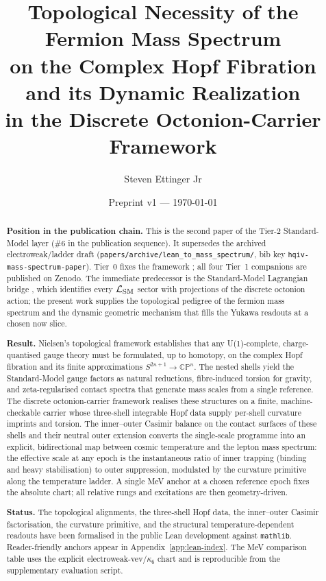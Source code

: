 \documentclass[11pt]{amsart}
\title[Topological Necessity of the Fermion Mass Spectrum]
{Topological Necessity of the Fermion Mass Spectrum\\[0.35em]
on the Complex Hopf Fibration and its Dynamic Realization\\[0.35em]
in the Discrete Octonion-Carrier Framework}
\author{Steven Ettinger Jr}
\date{Preprint v1 --- \today}
\begin{document}
\begin{abstract}
\noindent\textbf{Position in the publication chain.}
This is the second paper of the Tier-2 Standard-Model layer (\#6 in the
publication sequence). It supersedes the archived electroweak/ladder draft
(\texttt{papers/archive/lean\_to\_mass\_spectrum/}, bib key
\texttt{hqiv-mass-spectrum-paper}). Tier~0 fixes the framework
\cite{ettinger2026hqiv,hqiv-lightcone-paper,hqiv-so8-paper}; all four
Tier~1 companions
\cite{hqiv-3d-growth-paper,hqiv-oct-action-paper,hqiv-kirchhoff-paper,hqiv-thermo-arrow-paper}
are published on Zenodo. The immediate predecessor is the Standard-Model
Lagrangian bridge \cite{hqiv-sm-lagrangian-paper}, which identifies every
$\mathcal{L}_{\rm SM}$ sector with projections of the discrete octonion
action; the present work supplies the topological pedigree of the fermion
mass spectrum and the dynamic geometric mechanism that fills the Yukawa
readouts at a chosen now slice.

\noindent\textbf{Result.}
Nielsen's topological framework establishes that any U(1)-complete, charge-quantised gauge theory must be formulated, up to homotopy, on the complex Hopf fibration and its finite approximations $S^{2n+1}\to\mathbb{CP}^n$. The nested shells yield the Standard-Model gauge factors as natural reductions, fibre-induced torsion for gravity, and zeta-regularised contact spectra that generate mass scales from a single reference. The discrete octonion-carrier framework realises these structures on a finite, machine-checkable carrier whose three-shell integrable Hopf data supply per-shell curvature imprints and torsion. The inner--outer Casimir balance on the contact surfaces of these shells and their neutral outer extension converts the single-scale programme into an explicit, bidirectional map between cosmic temperature and the lepton mass spectrum: the effective scale at any epoch is the instantaneous ratio of inner trapping (binding and heavy stabilisation) to outer suppression, modulated by the curvature primitive along the temperature ladder. A single MeV anchor at a chosen reference epoch fixes the absolute chart; all relative rungs and excitations are then geometry-driven.

\noindent\textbf{Status.}
The topological alignments, the three-shell Hopf data, the inner--outer Casimir factorisation, the curvature primitive, and the structural temperature-dependent readouts have been formalised in the public Lean development against \texttt{mathlib}. Reader-friendly anchors appear in Appendix~\ref{app:lean-index}. The MeV comparison table uses the explicit electroweak-vev/\(\kappa_6\) chart and is reproducible from the supplementary evaluation script.
\end{abstract}
\maketitle
\end{document}
